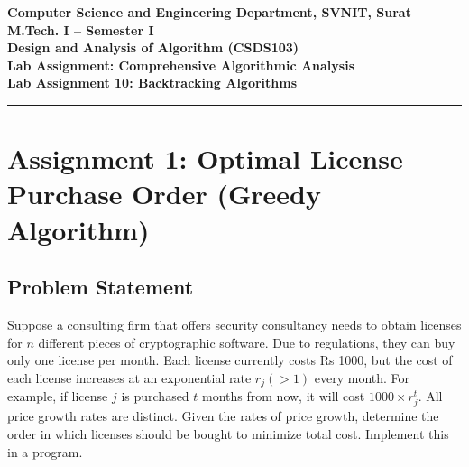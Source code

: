 \documentclass[12pt]{article}
\begin{document}

\begin{center}
\textbf{Computer Science and Engineering Department, SVNIT, Surat}\\
\textbf{M.Tech. I -- Semester I}\\
\textbf{Design and Analysis of Algorithm (CSDS103)}\\
\textbf{Lab Assignment: Comprehensive Algorithmic Analysis}\\
\textbf{Lab Assignment 10: Backtracking Algorithms}
\end{center}
\vspace{-4pt}
\hrule
\vspace{4pt}

\vspace{0.3cm}

\section*{Assignment 1: Optimal License Purchase Order (Greedy Algorithm)}

\subsection*{Problem Statement}
Suppose a consulting firm that offers security consultancy needs to obtain licenses for $n$ different pieces of cryptographic software. Due to regulations, they can buy only one license per month. Each license currently costs Rs 1000, but the cost of each license increases at an exponential rate $r_j (> 1)$ every month. For example, if license $j$ is purchased $t$ months from now, it will cost $1000 \times r_j^t$. All price growth rates are distinct. Given the rates of price growth, determine the order in which licenses should be bought to minimize total cost. Implement this in a program.
\end{document}
